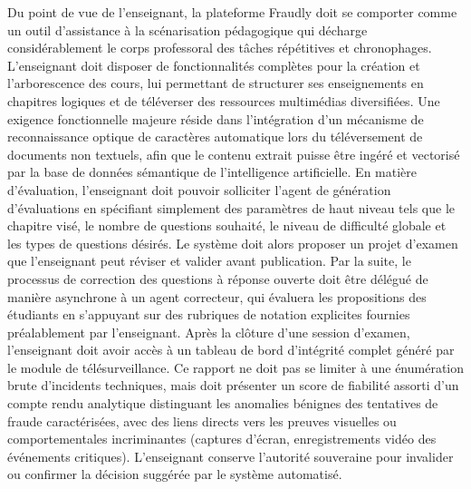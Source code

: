 Du point de vue de l'enseignant, la plateforme Fraudly doit se comporter comme un outil d'assistance à la scénarisation pédagogique qui décharge considérablement le corps professoral des tâches répétitives et chronophages. L'enseignant doit disposer de fonctionnalités complètes pour la création et l'arborescence des cours, lui permettant de structurer ses enseignements en chapitres logiques et de téléverser des ressources multimédias diversifiées. Une exigence fonctionnelle majeure réside dans l'intégration d'un mécanisme de reconnaissance optique de caractères automatique lors du téléversement de documents non textuels, afin que le contenu extrait puisse être ingéré et vectorisé par la base de données sémantique de l'intelligence artificielle. En matière d'évaluation, l'enseignant doit pouvoir solliciter l'agent de génération d'évaluations en spécifiant simplement des paramètres de haut niveau tels que le chapitre visé, le nombre de questions souhaité, le niveau de difficulté globale et les types de questions désirés. Le système doit alors proposer un projet d'examen que l'enseignant peut réviser et valider avant publication. Par la suite, le processus de correction des questions à réponse ouverte doit être délégué de manière asynchrone à un agent correcteur, qui évaluera les propositions des étudiants en s'appuyant sur des rubriques de notation explicites fournies préalablement par l'enseignant. Après la clôture d'une session d'examen, l'enseignant doit avoir accès à un tableau de bord d'intégrité complet généré par le module de télésurveillance. Ce rapport ne doit pas se limiter à une énumération brute d'incidents techniques, mais doit présenter un score de fiabilité assorti d'un compte rendu analytique distinguant les anomalies bénignes des tentatives de fraude caractérisées, avec des liens directs vers les preuves visuelles ou comportementales incriminantes (captures d'écran, enregistrements vidéo des événements critiques). L'enseignant conserve l'autorité souveraine pour invalider ou confirmer la décision suggérée par le système automatisé.

